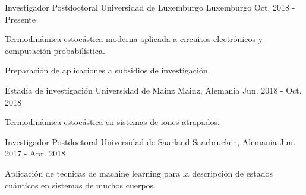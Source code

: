 

\begin{cventries}

  \cventry
    {Investigador Postdoctoral} %
    {Universidad de Luxemburgo} %
    {Luxemburgo} %
    {Oct. 2018 - Presente} %
    {
      \begin{cvitems} %
        \item{Termodinámica estocástica moderna aplicada a circuitos electrónicos y computación probabilística.}
        \item{Preparación de aplicaciones a subsidios de investigación.}
      \end{cvitems}
    }

  \cventry
    {Estadía de investigación} %
    {Universidad de Mainz} %
    {Mainz, Alemania} %
    {Jun. 2018 - Oct. 2018} %
    {
      \begin{cvitems} %
        \item Termodinámica estocástica en sistemas de iones atrapados.
      \end{cvitems}
    }

  \cventry
    {Investigador Postdoctoral} %
    {Universidad de Saarland} %
    {Saarbrucken, Alemania} %
    {Jun. 2017 - Apr. 2018} %
    {
      \begin{cvitems} %
        \item Aplicación de técnicas de machine learning para la descripción
        de estados cuánticos en sistemas de muchos cuerpos.
      \end{cvitems}
    }


\end{cventries}
